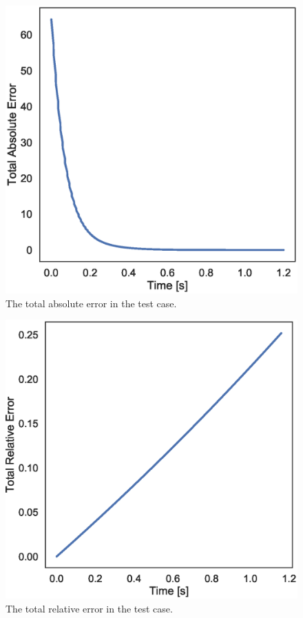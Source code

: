 \documentclass[aps,reprint]{revtex4-1}
\begin{document}
\begin{figure}[ht]
  \centering
  \includegraphics[width=\columnwidth]{figures/sin_absolute_error.eps}
  \caption{\label{fig:sinabserr} The total absolute error in the test case.}
\end{figure}


\begin{figure}[ht]
  \centering
  \includegraphics[width=\columnwidth]{figures/sin_relative_error.eps}
  \caption{\label{fig:sinrelerr} The total relative error in the test case.}
\end{figure}
\end{document}

